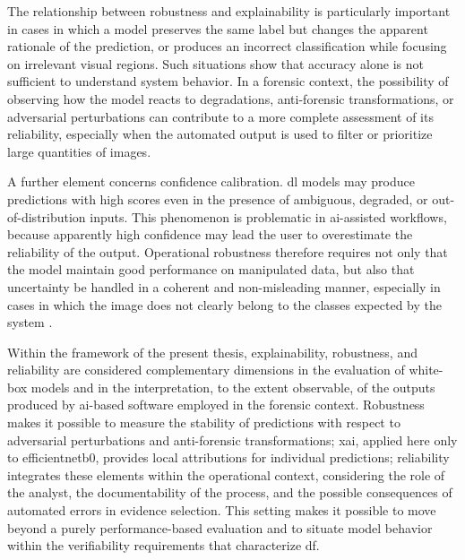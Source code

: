 The relationship between robustness and explainability is particularly
important in cases in which a model preserves the same label but changes the
apparent rationale of the prediction, or produces an incorrect classification
while focusing on irrelevant visual regions. Such situations show that accuracy
alone is not sufficient to understand system behavior. In a forensic context,
the possibility of observing how the model reacts to degradations,
anti-forensic transformations, or adversarial perturbations can contribute to a
more complete assessment of its reliability, especially when the automated
output is used to filter or prioritize large quantities of images.

A further element concerns confidence calibration. \gls{dl} models may produce
predictions with high scores even in the presence of ambiguous, degraded, or
out-of-distribution inputs. This phenomenon is problematic in \gls{ai}-assisted
workflows, because apparently high confidence may lead the user to overestimate
the reliability of the output. Operational robustness therefore requires not
only that the model maintain good performance on manipulated data, but also
that uncertainty be handled in a coherent and non-misleading manner, especially
in cases in which the image does not clearly belong to the classes expected by
the system \cite{hendrycks2017baseline,fort2021exploring}.

Within the framework of the present thesis, explainability, robustness, and
reliability are considered complementary dimensions in the evaluation of white-box models and in the interpretation, to the extent observable, of the outputs
produced by \gls{ai}-based software employed in the forensic context.
Robustness makes it possible to measure the stability of predictions with
respect to adversarial perturbations and anti-forensic transformations;
\gls{xai}, applied here only to \gls{efficientnetb0}, provides local
attributions for individual predictions; reliability integrates
these elements within the operational context, considering the role of the
analyst, the documentability of the process, and the possible consequences of
automated errors in evidence selection. This setting makes it possible to move
beyond a purely performance-based evaluation and to situate model behavior
within the verifiability requirements that characterize \gls{df}.


